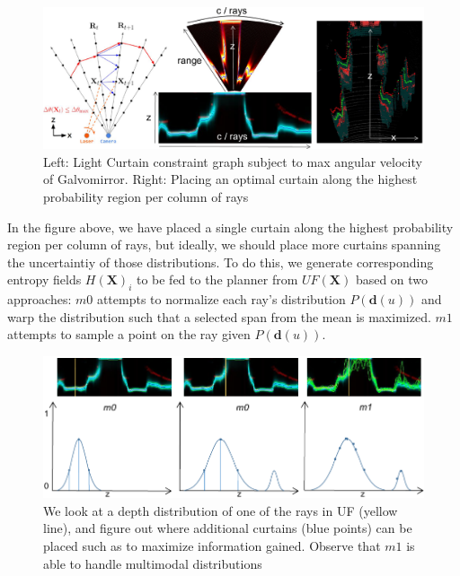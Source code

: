 \documentclass[review]{cvpr}
\newcommand{\X}{\mathbf{X}}
\begin{document}
\begin{figure}[h]
   \centering
   \begin{minipage}{0.5\textwidth}
       \centering
       \includegraphics[width=1.0\textwidth]{figures/planner.pdf}
   \end{minipage}\hfill
   \centering
   \caption{Left: Light Curtain constraint graph subject to max angular velocity of Galvomirror. Right: Placing an optimal curtain along the highest probability region per column of rays}
\end{figure}

In the figure above, we have placed a single curtain along the highest probability region per column of rays, but ideally, we should place more curtains spanning the uncertaintiy of those distributions. To do this, we generate corresponding entropy fields $H(\X)_{i}$ to be fed to the planner from $UF(\X)$ based on two approaches: $m0$ attempts to normalize each ray's distribution $P(\mathbf{d}(u))$ and warp the distribution such that a selected span from the mean is maximized. $m1$ attempts to sample a point on the ray given $P(\mathbf{d}(u))$. 

\begin{figure}[h]
   \centering
   \begin{minipage}{0.5\textwidth}
       \centering
       \includegraphics[width=1.0\textwidth]{figures/fields.pdf}
   \end{minipage}\hfill
   \centering
   \caption{We look at a depth distribution of one of the rays in UF (yellow line), and figure out where additional curtains (blue points) can be placed such as to maximize information gained. Observe that $m1$ is able to handle multimodal distributions}
   \label{fig:m0m1}
\end{figure}
\end{document}
